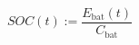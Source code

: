 \begin{equation}
	SOC(t) := \frac{E_\text{bat}(t)}{C_\text{bat}}
	\label{ch1:equ:state-of-charge-definition}
\end{equation}
